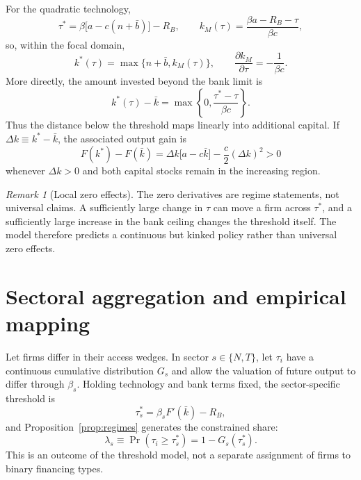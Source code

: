 \documentclass[11pt]{article}
\theoremstyle{definition}
\theoremstyle{remark}
\newtheorem{remark}{Remark}
\newcommand{\km}{k_M}
\newcommand{\Rb}{R_B}
\begin{document}
For the quadratic technology,
\begin{equation}\label{eq:quadraticcs}
\tau^*=\beta\bigl[a-c(n+\bar b)\bigr]-\Rb,
\qquad
\km(\tau)=\frac{\beta a-\Rb-\tau}{\beta c},
\end{equation}
so, within the focal domain,
\begin{equation}\label{eq:quadratic-policy}
k^*(\tau)=\max\{n+\bar b,\km(\tau)\},
\qquad
\frac{\partial\km}{\partial\tau}=-\frac{1}{\beta c}.
\end{equation}
More directly, the amount invested beyond the bank limit is
\begin{equation}\label{eq:investment-gap}
k^*(\tau)-\bar k
=\max\left\{0,\frac{\tau^*-\tau}{\beta c}\right\}.
\end{equation}
Thus the distance below the threshold maps linearly into additional capital.
If $\Delta k\equiv k^*-\bar k$, the associated output gain is
\begin{equation}\label{eq:output-gap}
F(k^*)-F(\bar k)
=\Delta k\bigl[a-c\bar k\bigr]-\frac{c}{2}(\Delta k)^2>0
\end{equation}
whenever $\Delta k>0$ and both capital stocks remain in the increasing region.

\begin{remark}[Local zero effects]
The zero derivatives are regime statements, not universal claims. A sufficiently
large change in $\tau$ can move a firm across $\tau^*$, and a sufficiently
large increase in the bank ceiling changes the threshold itself. The model
therefore predicts a continuous but kinked policy rather than universal zero
effects.
\end{remark}

\section{Sectoral aggregation and empirical mapping}

Let firms differ in their access wedges. In sector $s\in\{N,T\}$, let
$\tau_i$ have a continuous cumulative distribution $G_s$ and allow the
valuation of future output to differ through $\beta_s$. Holding technology and
bank terms fixed, the sector-specific threshold is
\begin{equation}\label{eq:sector-threshold}
\tau_s^*=\beta_s F'(\bar k)-\Rb,
\end{equation}
and Proposition~\ref{prop:regimes} generates the constrained share:
\begin{equation}\label{eq:constrained-share}
\lambda_s
\equiv\Pr(\tau_i\ge\tau_s^*)
=1-G_s(\tau_s^*).
\end{equation}
This is an outcome of the threshold model, not a separate assignment of firms
to binary financing types.
\end{document}
